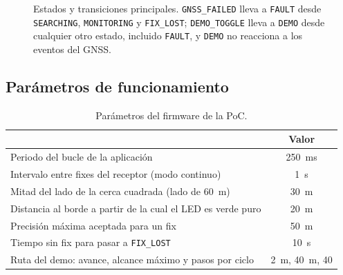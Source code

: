 \begin{figure}[H]
\centering
{}
\caption{Estados y transiciones principales. \texttt{GNSS\_FAILED} lleva a \texttt{FAULT} desde
\texttt{SEARCHING}, \texttt{MONITORING} y \texttt{FIX\_LOST}; \texttt{DEMO\_TOGGLE} lleva a
\texttt{DEMO} desde cualquier otro estado, incluido \texttt{FAULT}, y \texttt{DEMO} no reacciona a
los eventos del GNSS.}
\end{figure}

\subsection{Parámetros de funcionamiento}

\begin{table}[H]
\centering
\small
\begin{tabularx}{\textwidth}{|X c|}
\hline
\tablehead{\textbf{Parámetro} & \textbf{Valor}} \\ \hline
Periodo del bucle de la aplicación & 250~ms \\ \hline
Intervalo entre fixes del receptor (modo continuo) & 1~s \\ \hline
Mitad del lado de la cerca cuadrada (lado de 60~m) & 30~m \\ \hline
Distancia al borde a partir de la cual el LED es verde puro & 20~m \\ \hline
Precisión máxima aceptada para un fix & 50~m \\ \hline
Tiempo sin fix para pasar a \texttt{FIX\_LOST} & 10~s \\ \hline
Ruta del demo: avance, alcance máximo y pasos por ciclo & 2~m, 40~m, 40 \\ \hline
\end{tabularx}
\caption{Parámetros del firmware de la PoC.}
\end{table}

